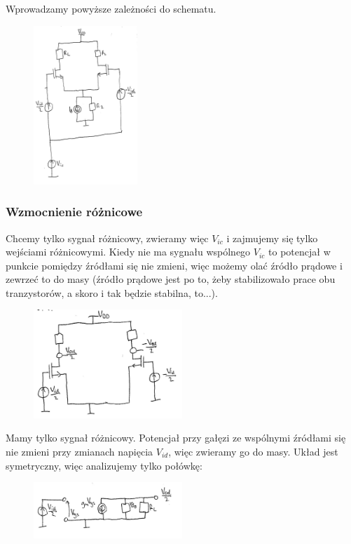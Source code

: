 \documentclass[10pt,a4paper]{article}
\begin{document}
Wprowadzamy powyższe zależności do schematu.
\begin{figure}[H]
\centering
\includegraphics[width=0.35\textwidth]{roznicowy_nowe_oznaczenia.png}
\end{figure}

\subsubsection{Wzmocnienie różnicowe}

Chcemy tylko sygnał różnicowy, zwieramy więc $V_{ic}$ i zajmujemy się tylko wejściami różnicowymi. Kiedy nie ma sygnału wspólnego $V_{ic}$ to potencjał w punkcie pomiędzy źródłami się nie zmieni, więc możemy olać źródło prądowe i zewrzeć to do masy (źródło prądowe jest po to, żeby stabilizowało prace obu tranzystorów, a skoro i tak będzie stabilna, to...).

\begin{figure}[H]
\centering
\includegraphics[width=0.5\textwidth]{roznicowy_roznica.png}
\end{figure}

Mamy tylko sygnał różnicowy. Potencjał przy gałęzi ze wspólnymi źródłami się nie zmieni przy zmianach napięcia $V_{id}$, więc zwieramy go do masy. Układ jest symetryczny, więc analizujemy tylko połówkę:
\begin{figure}[H]
\centering
\includegraphics[width=0.5\textwidth]{roznicowy_roznica_malosyg.png}
\end{figure}
\end{document}
